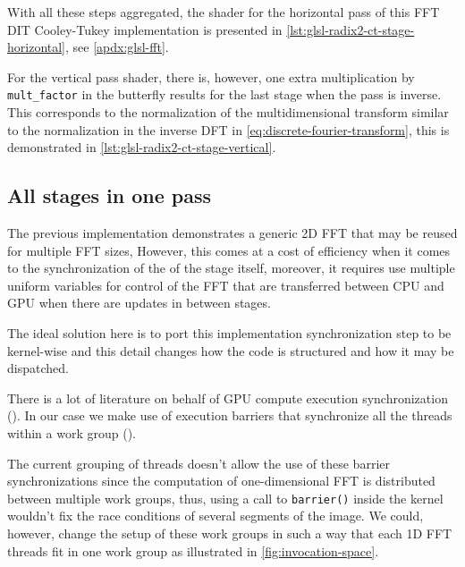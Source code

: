 \documentclass[
  oneside,
  11pt, a4paper,
  footinclude=true,
  headinclude=true,
  cleardoublepage=empty
]{scrbook}
\begin{document}
With all these steps aggregated, the shader for the horizontal pass of this FFT DIT Cooley-Tukey implementation is presented in \autoref{lst:glsl-radix2-ct-stage-horizontal}, see \autoref{apdx:glsl-fft}.


For the vertical pass shader, there is, however, one extra multiplication by \texttt{mult\_factor} in the butterfly results for the last stage when the pass is inverse. This corresponds to the normalization of the multidimensional transform similar to the normalization in the inverse DFT in \autoref{eq:discrete-fourier-transform}, this is demonstrated in \autoref{lst:glsl-radix2-ct-stage-vertical}.


\subsection{All stages in one pass} \label{subsec:all-stages-in-one-pass}

The previous implementation demonstrates a generic 2D FFT that may be reused for multiple FFT sizes, However, this comes at a cost of efficiency when it comes to the synchronization of the of the stage itself, moreover, it requires use multiple uniform variables for control of the FFT that are transferred between CPU and GPU when there are updates in between stages.
\newline

The ideal solution here is to port this implementation synchronization step to be kernel-wise and this detail changes how the code is structured and how it may be dispatched.


There is a lot of literature on behalf of GPU compute execution synchronization (\cite{stuart2011efficient}). In our case we make use of execution barriers that synchronize all the threads within a work group (\cite{kessenich4opengl}).

The current grouping of threads doesn't allow the use of these barrier synchronizations since the computation of one-dimensional FFT is distributed between multiple work groups, thus, using a call to \texttt{barrier()} inside the kernel wouldn't fix the race conditions of several segments of the image. We could, however, change the setup of these work groups in such a way that each 1D FFT threads fit in one work group as illustrated in \autoref{fig:invocation-space}. 
\end{document}
